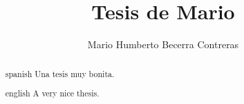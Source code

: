 \documentclass{tesisITAM}
\title{Tesis de Mario}
\author{Mario Humberto Becerra Contreras}
\begin{document}
	\npthousandsep{,}
	\maketitle
	\publicationrights
	

	
	


	\begin{abstract}{spanish}
		Una tesis muy bonita.
	\end{abstract}

	\begin{abstract}{english}
		A very nice thesis.
	\end{abstract}

	\setcounter{page}{1}

	\tableofcontents
	\listoffigures
	\listoftables
	\newpage

	\setcounter{page}{1}


	

	

	

	

	
	

	\appendix

	\clearpage


	

\end{document}
